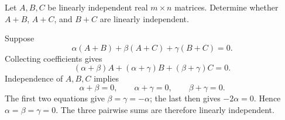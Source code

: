 \begin{problem}\label{ex:01:independent-pairwise-sums}
Let $A,B,C$ be linearly independent real $m\times n$ matrices.
Determine whether $A+B$, $A+C$, and $B+C$ are linearly independent.
\end{problem}
\begin{solution}
Suppose
\[
\alpha(A+B)+\beta(A+C)+\gamma(B+C)=0.
\]
Collecting coefficients gives
\[
(\alpha+\beta)A+(\alpha+\gamma)B+(\beta+\gamma)C=0.
\]
Independence of $A,B,C$ implies
\[
\alpha+\beta=0,\qquad
\alpha+\gamma=0,\qquad
\beta+\gamma=0.
\]
The first two equations give $\beta=\gamma=-\alpha$; the last then
gives $-2\alpha=0$. Hence $\alpha=\beta=\gamma=0$.
The three pairwise sums are therefore linearly independent.
\end{solution}
